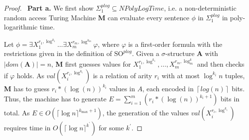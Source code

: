 \documentclass{article}
\begin{document}
\begin{proof}
\ \textbf{Part a.} We first show $\Sigma^{\mathit{plog}}_1 \subseteq NPolyLogTime$, i.e. a non-deterministic random access Turing Machine \textbf{M} can evaluate every sentence $\phi$ in $\Sigma^{\mathit{plog}}_1$ in poly-logarithmic time. 

Let $\phi = \exists X_1^{r_1,\log^{k_1}} \dots \exists X_m^{r_m,\log^{k_m}} \varphi$, where $\varphi$ is a first-order formula with the restrictions given in the definition of $\mathrm{SO}^{\mathit{plog}}$. Given a $\sigma$-structure \textbf{A} with $|dom(\textbf{A})|=n$, \textbf{M} first guesses values for $X_1^{r_1,\log^{k_1}},\dots, X_m^{r_m,\log^k_m}$ and then checks if $\varphi$ holds. As $val(X_i^{r_i,\log^{k_i}})$ is a relation of arity $r_i$ with at most $\log^{k_i} n$ tuples, \textbf{M} has to guess $r_i*{(\log(n))}^{k_i}$ values in $A$, each encoded in $\left \lceil log(n)\right \rceil$ bits. Thus, the machine has to generate $E = \sum\limits_{i=1}^{m}\left ( r_i*{(\log(n))}^{k_i+1}\right )$ bits in total. As $E \in O(\lceil \log n \rceil^{k_{\max} + 1})$, the generation of the values $val(X_i^{r_i,\log^{k_i}})$ requires time in $O(\lceil \log n \rceil^{k^\prime})$ for some $k^\prime$.
    

\end{proof}
\end{document}

